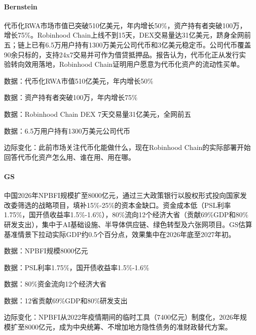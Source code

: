 \documentclass[11pt]{ctexart}
\begin{document}
\paragraph{Bernstein} 代币化RWA市场市值已突破510亿美元，年内增长50\%，资产持有者突破100万，增长75\%。Robinhood Chain上线不到15天，DEX交易量达31亿美元，跻身全网前五；链上已有6.5万用户持有1300万美元公司代币和3亿美元稳定币。公司代币覆盖90余只标的，支持24x7交易并可作为借贷抵押品。报告认为，代币化正从发行实验转向效用落地，Robinhood Chain证明用户愿意为代币化资产的流动性买单。
{\small\color{refgray}数据：代币化RWA市值510亿美元，年内增长50\%\par}
{\small\color{refgray}数据：资产持有者突破100万，年内增长75\%\par}
{\small\color{refgray}数据：Robinhood Chain DEX 7天交易量31亿美元，全网前五\par}
{\small\color{refgray}数据：6.5万用户持有1300万美元公司代币\par}
{\small\color{refgray}边际变化：此前市场关注代币化能做什么，现在Robinhood Chain的实际部署开始回答代币化资产怎么用、谁在用、用在哪。\par}
\paragraph{GS} 中国2026年NPBFI规模扩至8000亿元，通过三大政策银行以股权形式投向国家发改委筛选的战略项目，填补15\%-25\%的资本金缺口。资金成本低（PSL利率1.75\%，国开债收益率1.5\%-1.6\%），80\%流向12个经济大省（贡献69\%GDP和80\%研发支出），集中于AI基础设施、半导体供应链、绿色转型及六张网项目。GS估算基准情景下拉动实际GDP约0.5个百分点，效果集中在2026年底至2027年初。
{\small\color{refgray}数据：NPBFI规模8000亿元\par}
{\small\color{refgray}数据：PSL利率1.75\%，国开债收益率1.5\%-1.6\%\par}
{\small\color{refgray}数据：80\%资金流向12个经济大省\par}
{\small\color{refgray}数据：12省贡献69\%GDP和80\%研发支出\par}
{\small\color{refgray}边际变化：NPBFI从2022年疫情期间的临时工具（7400亿元）制度化，2026年规模扩至8000亿元，成为中央统筹、不增加地方隐性债务的准财政替代方案。\par}
\end{document}
